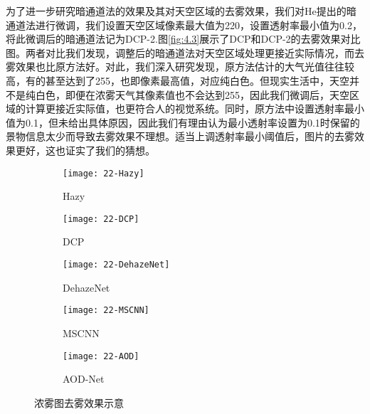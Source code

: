\documentclass[a4paper, 12pt, oneside]{report}
\begin{document}
{为了进一步研究暗通道法的效果及其对天空区域的去雾效果，我们对He提出的暗通道法进行微调，我们设置天空区域像素最大值为220，设置透射率最小值为0.2，将此微调后的暗通道法记为DCP-2.图\ref{fig:4.3}展示了DCP和DCP-2的去雾效果对比图。两者对比我们发现，调整后的暗通道法对天空区域处理更接近实际情况，而去雾效果也比原方法好。对此，我们深入研究发现，原方法估计的大气光值往往较高，有的甚至达到了255，也即像素最高值，对应纯白色。但现实生活中，天空并不是纯白色，即便在浓雾天气其像素值也不会达到255，因此我们微调后，天空区域的计算更接近实际值，也更符合人的视觉系统。同时，原方法中设置透射率最小值为0.1，但未给出具体原因，因此我们有理由认为最小透射率设置为0.1时保留的景物信息太少而导致去雾效果不理想。适当上调透射率最小阈值后，图片的去雾效果更好，这也证实了我们的猜想。

\begin{figure}
    \centering
            \begin{subfigure}{.9\linewidth}
                \texttt{[image: 22-Hazy]}
                \caption{Hazy}
                \label{fig:sfig1111}
            \end{subfigure}
        \endminipage\hfill
        \begin{subfigure}{.9\linewidth}
            \texttt{[image: 22-DCP]}
            \caption{DCP}
            \label{fig:sfig2222}
        \end{subfigure} 
        \begin{subfigure}{.9\linewidth}
            \texttt{[image: 22-DehazeNet]}
            \caption{DehazeNet}
            \label{fig:sfig3333}
        \end{subfigure} 
    \endminipage\hfill
        \begin{subfigure}{.9\linewidth}
            \texttt{[image: 22-MSCNN]}
            \caption{MSCNN}
            \label{fig:sfig4444}
        \end{subfigure} 
        \begin{subfigure}{.9\linewidth}
            \texttt{[image: 22-AOD]}
            \caption{AOD-Net}
            \label{fig:sfig5555}
        \end{subfigure} 
    	\endminipage
    \caption{浓雾图去雾效果示意}
	\label{fig:4.4}
\end{figure}

}
\end{document}
